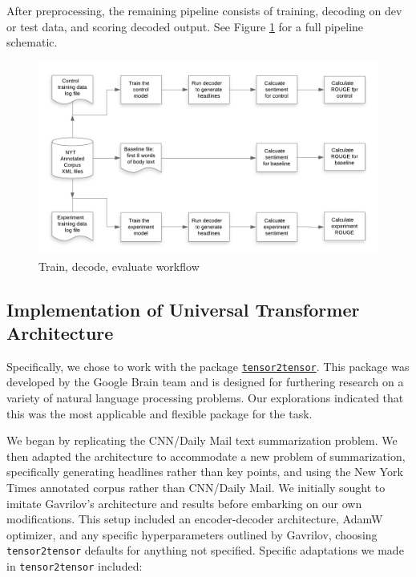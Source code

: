 \documentclass[11pt]{article}
\begin{document}
After preprocessing, the remaining pipeline consists of training, decoding on dev or test data, and scoring decoded output. See Figure \ref{figure:decode} for a full pipeline schematic.

\begin{figure}
  \centering
  \includegraphics[width=\textwidth]{HeadGen_post_p.png}
  \caption{Train, decode, evaluate workflow}
  \label{figure:decode}
\end{figure}

\subsection{Implementation of Universal Transformer Architecture}
Specifically, we chose to work with the package \href{https://github.com/tensorflow/tensor2tensor}{\texttt{tensor2tensor}}. This package was developed by the Google Brain team and is designed for furthering research on a variety of natural language processing problems\cite{vaswani-etal-2018-tensor2tensor}. Our explorations indicated that this was the most applicable and flexible package for the task.

We began by replicating the CNN/Daily Mail text summarization problem. We then adapted the architecture to accommodate a new problem of summarization, specifically generating headlines rather than key points, and using the New York Times annotated corpus rather than CNN/Daily Mail. We initially sought to imitate Gavrilov's architecture and results before embarking on our own modifications. This setup included an encoder-decoder architecture, AdamW optimizer, and any specific hyperparameters outlined by Gavrilov, choosing \texttt{tensor2tensor} defaults for anything not specified. Specific adaptations we made in \texttt{tensor2tensor} included:
\end{document}
